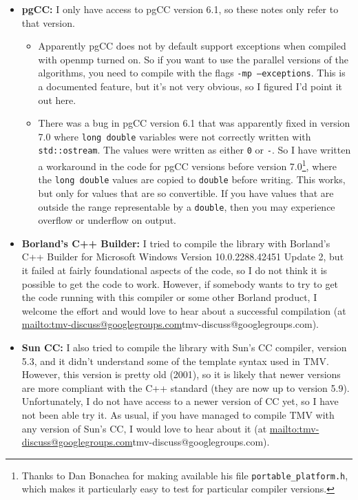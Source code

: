 \documentclass[twoside,letterpaper,11pt]{article}
\makeatletter
\newcommand{\mygroupx}{tmv-discuss@googlegroups.com}
\newcommand{\mygroup}{\url{mailto:\mygroupx}{\mygroupx}}
\renewcommand{\tt}[1]{{\lstinline {#1}}}
\makeatother
\begin{document}
\begin{itemize}
\item {\bf pgCC:}
I only have access to pgCC version 6.1, so these notes only refer to that version.
\begin{itemize}
\item
Apparently pgCC does not by default support exceptions when compiled 
with openmp turned on.  
So if you want to use the parallel versions of the algorithms,
you need to compile with the flags \texttt{-mp --exceptions}.  This is a documented feature,
but it's not very obvious, so I figured I'd point it out here.

\item 
There was a bug in pgCC version 6.1 that was apparently fixed in version 7.0 where
\tt{long double} variables were not correctly written with \tt{std::ostream}.  The values
were written as either \tt{0} or \tt{-}.  So I have written a workaround in the code for
pgCC versions before version 7.0\footnote{
Thanks to Dan Bonachea for making available his file \texttt{portable\_platform.h},
which makes it particularly easy to test for particular compiler versions.},
where the \tt{long double} values are copied to 
\tt{double} before writing.  This works, but only for values that are so convertible.
If you have values that are outside the range representable by a \tt{double}, then 
you may experience overflow or underflow on output.

\end{itemize}

\item {\bf Borland's C++ Builder:}
I tried to compile the library with Borland's C++ Builder for Microsoft Windows
Version 10.0.2288.42451 Update 2, but it failed at fairly foundational aspects of the 
code, so I do not think it is possible to get the code to work.  However, if somebody wants
to try to get the code running with this compiler or some other Borland product, 
I welcome the effort and would
love to hear about a successful compilation (at \mygroup).

\item {\bf Sun CC:}
I also tried to compile the library with Sun's CC compiler, version 5.3, 
and it didn't understand some of the template syntax used in TMV.  However,
this version is pretty old (2001), so it is likely that newer versions are more
compliant with the C++ standard (they are now up to version 5.9).  
Unfortunately, I do not have access to a newer version of CC yet, so I have not
been able try it.  As usual, if you have managed to compile TMV with
any version of Sun's CC, I would love to hear about it (at \mygroup).


\end{itemize}
\end{document}
